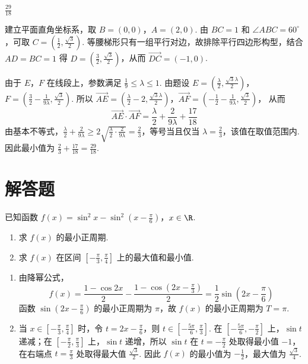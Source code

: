 \begin{answer}
\(\frac{29}{18}\)
\end{answer}

\begin{solution}
建立平面直角坐标系，取 \(B=(0,0)\)，\(A=(2,0)\). 由 \(BC=1\) 和 \(\angle ABC=60^\circ\)，可取 \(C=\left(\frac12,\frac{\sqrt3}{2}\right)\). 等腰梯形只有一组平行对边，故排除平行四边形构型，结合 \(AD=BC=1\) 得 \(D=\left(\frac32,\frac{\sqrt3}{2}\right)\)，从而 \(\overrightarrow{DC}=(-1,0)\).

由于 \(E\)，\(F\) 在线段上，参数满足 \(\frac19\leqslant\lambda\leqslant1\). 由题设
\(E=\left(\frac\lambda2,\frac{\sqrt3\lambda}{2}\right)\)，\(F=\left(\frac32-\frac{1}{9\lambda},\frac{\sqrt3}{2}\right)\).
所以
\(\overrightarrow{AE}=\left(\frac\lambda2-2,\frac{\sqrt3\lambda}{2}\right)\)，\(\overrightarrow{AF}=\left(-\frac12-\frac{1}{9\lambda},\frac{\sqrt3}{2}\right)\)，
从而
\[
\overrightarrow{AE}\cdot\overrightarrow{AF}=\frac\lambda2+\frac{2}{9\lambda}+\frac{17}{18}
\]
由基本不等式，\(\frac\lambda2+\frac{2}{9\lambda}\geqslant2\sqrt{\frac\lambda2\cdot\frac{2}{9\lambda}}=\frac23\)，等号当且仅当 \(\lambda=\frac23\)，该值在取值范围内. 因此最小值为 \(\frac23+\frac{17}{18}=\frac{29}{18}\).
\end{solution}

\section{解答题}

\begin{problem}
已知函数 \(f(x) = \sin^2 x - \sin^2 \left( x - \frac{\pi}{6} \right)\)，\(x \in \R\).

\begin{enumerate}
\item 求 \( f(x) \) 的最小正周期.
\item 求 \( f(x) \) 在区间 \( \left[-\frac{\pi}{3}, \frac{\pi}{4}\right] \) 上的最大值和最小值.
\end{enumerate}
\end{problem}

\begin{solution}
\begin{enumerate}
\item 由降幂公式，
\[
f(x)=\frac{1-\cos2x}{2}-\frac{1-\cos\left(2x-\frac\pi3\right)}{2}=\frac12\sin\left(2x-\frac\pi6\right)
\]
函数 \(\sin\left(2x-\frac\pi6\right)\) 的最小正周期为 \(\pi\)，故 \(f(x)\) 的最小正周期为 \(T=\pi\).
\item 当 \(x\in\left[-\frac\pi3,\frac\pi4\right]\) 时，令 \(t=2x-\frac\pi6\)，则 \(t\in\left[-\frac{5\pi}{6},\frac\pi3\right]\). 在 \(\left[-\frac{5\pi}{6},-\frac\pi2\right]\) 上，\(\sin t\) 递减；在 \(\left[-\frac\pi2,\frac\pi3\right]\) 上，\(\sin t\) 递增，所以 \(\sin t\) 在 \(t=-\frac\pi2\) 处取得最小值 \(-1\)，在右端点 \(t=\frac\pi3\) 处取得最大值 \(\frac{\sqrt3}{2}\). 因此 \(f(x)\) 的最小值为 \(-\frac12\)，最大值为 \(\frac{\sqrt3}{4}\).
\end{enumerate}
\end{solution}

